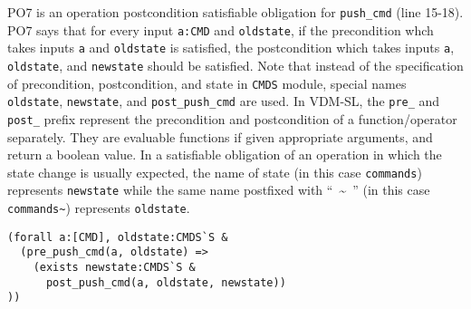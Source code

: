 PO7 is an operation postcondition satisfiable obligation for {\tt push\_cmd} (line 15-18). PO7 says that for every input {\tt a:CMD} and {\tt oldstate}, if the precondition whch takes inputs {\tt a} and {\tt oldstate} is satisfied, the postcondition which takes inputs {\tt a}, {\tt oldstate}, and {\tt newstate} should be satisfied. Note that instead of the specification of precondition, postcondition, and state in {\tt CMDS} module, special names {\tt oldstate}, {\tt newstate}, and {\tt post\_push\_cmd} are used. In VDM-SL, the {\tt pre\_} and {\tt post\_} prefix represent the precondition and postcondition of a function/operator separately. They are evaluable functions if given appropriate arguments, and return a boolean value. In a satisfiable obligation of an operation in which the state change is usually expected, the name of state (in this case {\tt commands}) represents {\tt newstate} while the same name postfixed with ``~\textasciitilde~'' (in this case {\tt commands\textasciitilde}) represents {\tt oldstate}.

\begin{mdframed}[roundcorner=5pt]
\begin{Verbatim}[fontsize=\small]
(forall a:[CMD], oldstate:CMDS`S & 
  (pre_push_cmd(a, oldstate) => 
    (exists newstate:CMDS`S & 
      post_push_cmd(a, oldstate, newstate))
))
\end{Verbatim}
\end{mdframed}
